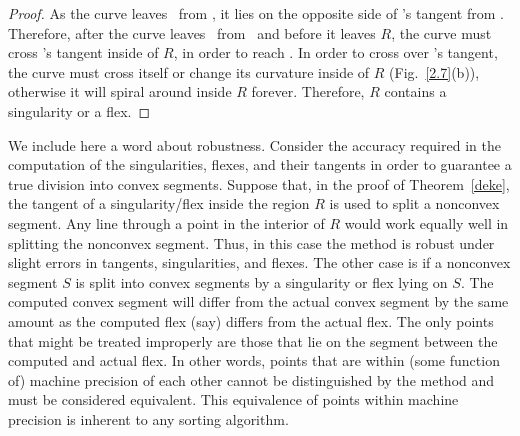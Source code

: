 \begin{proof}
%

As the curve leaves \xotha\ from \xo,
it lies on the opposite side of \xo's tangent from \seg{\xo\xth}.
Therefore, after the curve leaves \xotha\ from \xo\ and before it leaves
$R$, the curve must cross \xo's tangent inside of $R$, in order to reach 
\seg{\xo\xth}.
In order to cross over \xo's tangent, the curve
must cross itself or change its curvature inside of $R$ (Fig.~\ref{2.7}(b)),
otherwise it will spiral around inside $R$ forever.
Therefore, $R$ contains a singularity or a flex.
\end{proof}

We include here a word about robustness.
Consider the accuracy required in the computation of the singularities, flexes, 
and their tangents in order to guarantee a true division into convex segments.
Suppose that, in the proof of Theorem~\ref{deke}, the tangent of a 
singularity/flex inside the region $R$ is used to split a nonconvex segment.
Any line through a point in the interior of $R$ would work equally well in splitting
the nonconvex segment.
Thus, in this case the method is robust under slight errors in tangents, singularities,
and flexes.
The other case is if a nonconvex segment $S$ is split into convex segments by a 
singularity or flex lying on $S$. 
The computed convex segment will differ from the actual convex segment by the same
amount as the computed flex (say) differs from the actual flex.
The only points that might be treated improperly are those that lie on the segment
between the computed and actual flex.
In other words, points that are within (some function of) machine precision 
of each other cannot be distinguished by the method and must be considered 
equivalent.
This equivalence of points within machine precision is inherent to any sorting 
algorithm.

